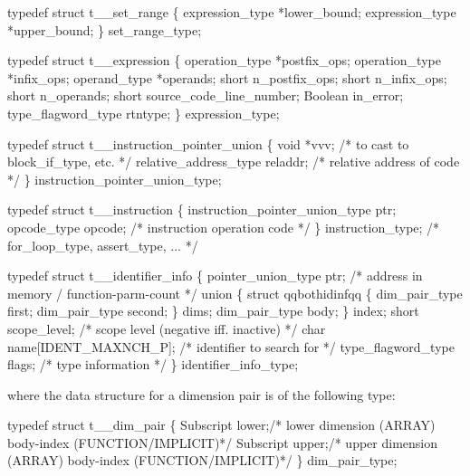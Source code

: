 \begin{codeexample}
typedef struct t__set_range
   \{
       expression_type *lower_bound;
       expression_type *upper_bound;
   \} set_range_type;
\end{codeexample}

\begin{codeexample}
typedef struct t__expression
   \{
       operation_type *postfix_ops;
       operation_type *infix_ops;
       operand_type *operands;
       short n_postfix_ops;
       short n_infix_ops;
       short n_operands;
       short source_code_line_number;
       Boolean in_error;
       type_flagword_type rtntype;
   \} expression_type;
\end{codeexample}

\begin{codeexample}
typedef struct t__instruction_pointer_union
   \{
       void *vvv;                      /* to cast to block_if_type, etc. */
       relative_address_type reladdr;  /* relative address of code */
   \} instruction_pointer_union_type;
\end{codeexample}

\begin{codeexample}
typedef struct t__instruction
   \{
       instruction_pointer_union_type ptr;
       opcode_type opcode;      /* instruction operation code */
   \} instruction_type;          /*    for_loop_type, assert_type, ... */
\end{codeexample}

\begin{codeexample}
typedef struct t__identifier_info
  \{
     pointer_union_type ptr;    /* address in memory / function-parm-count */
     union
        \{
           struct qqbothidinfqq
              \{
                 dim_pair_type first;
                 dim_pair_type second;
              \} dims;
           dim_pair_type body;
        \} index;
     short scope_level;         /* scope level (negative iff. inactive) */
     char name[IDENT_MAXNCH_P]; /* identifier to search for */
     type_flagword_type flags;  /* type information */
  \} identifier_info_type;
\end{codeexample}
where the data structure for a dimension pair is of the following type:
\begin{codeexample}
typedef struct t__dim_pair
  \{
    Subscript lower;/* lower dimension (ARRAY) body-index (FUNCTION/IMPLICIT)*/
    Subscript upper;/* upper dimension (ARRAY) body-index (FUNCTION/IMPLICIT)*/
  \} dim_pair_type;
\end{codeexample}

